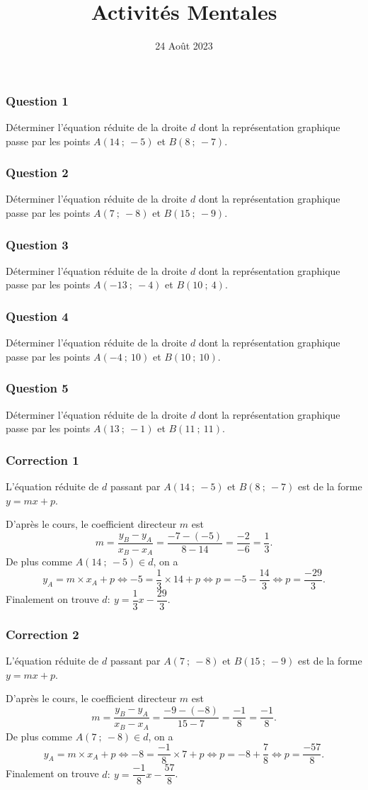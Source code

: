 \documentclass[15pt, mathserif]{beamer}
\title{Activités Mentales}
\date{24 Août 2023}
\begin{document}
\begin{frame}
    \titlepage
\end{frame}

\begin{frame} 
	\frametitle{Question 1}
Déterminer l'équation réduite de la droite $d$ dont la représentation graphique passe par les points $A\left(14~;~-5\right)$ et $B\left(8~;~-7\right)$.\end{frame}


\begin{frame} 
	\frametitle{Question 2}
Déterminer l'équation réduite de la droite $d$ dont la représentation graphique passe par les points $A\left(7~;~-8\right)$ et $B\left(15~;~-9\right)$.\end{frame}


\begin{frame} 
	\frametitle{Question 3}
Déterminer l'équation réduite de la droite $d$ dont la représentation graphique passe par les points $A\left(-13~;~-4\right)$ et $B\left(10~;~4\right)$.\end{frame}


\begin{frame} 
	\frametitle{Question 4}
Déterminer l'équation réduite de la droite $d$ dont la représentation graphique passe par les points $A\left(-4~;~10\right)$ et $B\left(10~;~10\right)$.\end{frame}


\begin{frame} 
	\frametitle{Question 5}
Déterminer l'équation réduite de la droite $d$ dont la représentation graphique passe par les points $A\left(13~;~-1\right)$ et $B\left(11~;~11\right)$.\end{frame}


\begin{frame}
\vspace{-10mm}
	\frametitle{Correction 1}
L'équation réduite de $d$ passant par $A\left(14~;~-5\right)$ et $B\left(8~;~-7\right)$ est de la forme $y = mx + p$.

D'après le cours, le coefficient directeur $m$ est \[m = \dfrac{y_B-y_A}{x_B-x_A} = \dfrac{-7-\left(-5\right)}{8-14} = \dfrac{-2}{-6} = \dfrac{1}{3}.\] De plus comme $A(14~;~-5) \in d$, on a \[y_A = m \times x_A + p \Leftrightarrow -5 = \dfrac{1}{3}\times 14 + p \Leftrightarrow p = -5-\dfrac{14}{3} \Leftrightarrow p = \dfrac{-29}{3}.\] Finalement on trouve $d:~ y = \dfrac{1}{3}x-\dfrac{29}{3}$.\end{frame}


\begin{frame}
\vspace{-10mm}
	\frametitle{Correction 2}
L'équation réduite de $d$ passant par $A\left(7~;~-8\right)$ et $B\left(15~;~-9\right)$ est de la forme $y = mx + p$.

D'après le cours, le coefficient directeur $m$ est \[m = \dfrac{y_B-y_A}{x_B-x_A} = \dfrac{-9-\left(-8\right)}{15-7} = \dfrac{-1}{8} = \dfrac{-1}{8}.\] De plus comme $A(7~;~-8) \in d$, on a \[y_A = m \times x_A + p \Leftrightarrow -8 = \dfrac{-1}{8}\times 7 + p \Leftrightarrow p = -8+\dfrac{7}{8} \Leftrightarrow p = \dfrac{-57}{8}.\] Finalement on trouve $d:~ y = \dfrac{-1}{8}x-\dfrac{57}{8}$.\end{frame}
\end{document}
